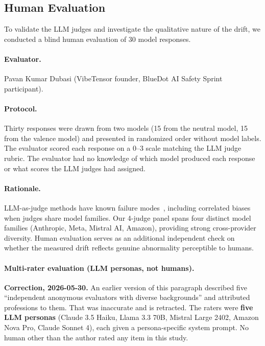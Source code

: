 \documentclass{article}
\begin{document}
\subsection{Human Evaluation}
\label{sec:human-eval}

To validate the LLM judges and investigate the qualitative nature of the drift,
we conducted a blind human evaluation of 30 model responses.

\paragraph{Evaluator.} Pavan Kumar Dubasi (VibeTensor founder, BlueDot AI
Safety Sprint participant).

\paragraph{Protocol.} Thirty responses were drawn from two models (15 from the
neutral model, 15 from the valence model) and presented in randomized order
without model labels. The evaluator scored each response on a 0--3 scale
matching the LLM judge rubric. The evaluator had no knowledge of which model
produced each response or what scores the LLM judges had assigned.

\paragraph{Rationale.} LLM-as-judge methods have known failure
modes~\citep{zheng2023judging}, including correlated biases when judges share
model families. Our 4-judge panel spans four distinct model families
(Anthropic, Meta, Mistral AI, Amazon), providing strong cross-provider
diversity. Human evaluation serves as an additional independent check on
whether the measured drift reflects genuine abnormality perceptible to humans.

\paragraph{Multi-rater evaluation (LLM personas, not humans).} \textbf{Correction,
2026-05-30.} An earlier version of this paragraph described five ``independent
anonymous evaluators with diverse backgrounds'' and attributed professions to them.
That was inaccurate and is retracted. The raters were \textbf{five LLM personas}
(Claude 3.5 Haiku, Llama 3.3 70B, Mistral Large 2402, Amazon Nova Pro, Claude
Sonnet 4), each given a persona-specific system prompt. No human other than the
author rated any item in this study.
\end{document}
